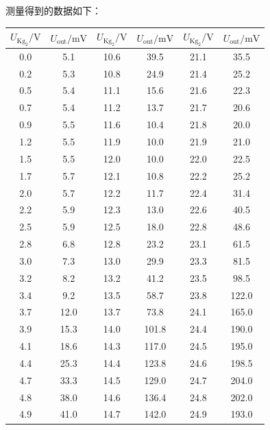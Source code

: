 \documentclass[a4paper,fontset=windows]{ctexart}
\begin{document}
    测量得到的数据如下：
    \begin{center}\Large
        \begin{longtable}{ cccccc }
            \toprule[0.1em]
            $U_{\mathrm{Kg_2}}/\mathrm{V}$ & $U_{\mathrm{out}}/\mathrm{mV}$ & $U_{\mathrm{Kg_2}}/\mathrm{V}$ & $U_{\mathrm{out}}/\mathrm{mV}$ & $U_{\mathrm{Kg_2}}/\mathrm{V}$ & $U_{\mathrm{out}}/\mathrm{mV}$ \\
            \midrule[0.06em]
            0.0  &  5.1  & 10.6 & 39.5  & 21.1 & 35.5  \\
            0.2  &  5.3  & 10.8 & 24.9  & 21.4 & 25.2  \\
            0.5  &  5.4  & 11.1 & 15.6  & 21.6 & 22.3  \\
            0.7  &  5.4  & 11.2 & 13.7  & 21.7 & 20.6  \\
            0.9  &  5.5  & 11.6 & 10.4  & 21.8 & 20.0  \\
            1.2  &  5.5  & 11.9 & 10.0  & 21.9 & 21.0  \\
            1.5  &  5.5  & 12.0 & 10.0  & 22.0 & 22.5  \\
            1.7  &  5.7  & 12.1 & 10.8  & 22.2 & 25.2  \\
            2.0  &  5.7  & 12.2 & 11.7  & 22.4 & 31.4  \\
            2.2  &  5.9  & 12.3 & 13.0  & 22.6 & 40.5  \\
            2.5  &  5.9  & 12.5 & 18.0  & 22.8 & 48.6  \\
            2.8  &  6.8  & 12.8 & 23.2  & 23.1 & 61.5  \\
            3.0  &  7.3  & 13.0 & 29.9  & 23.3 & 81.5  \\
            3.2  &  8.2  & 13.2 & 41.2  & 23.5 & 98.5  \\
            3.4  &  9.2  & 13.5 & 58.7  & 23.8 & 122.0 \\
            3.7  & 12.0  & 13.7 & 73.8  & 24.1 & 165.0 \\
            3.9  & 15.3  & 14.0 & 101.8 & 24.4 & 190.0 \\
            4.1  & 18.6  & 14.3 & 117.0 & 24.5 & 195.0 \\
            4.4  & 25.3  & 14.4 & 123.8 & 24.6 & 198.5 \\
            4.7  & 33.3  & 14.5 & 129.0 & 24.7 & 204.0 \\
            4.8  & 38.0  & 14.6 & 136.4 & 24.8 & 202.0 \\
            4.9  & 41.0  & 14.7 & 142.0 & 24.9 & 193.0 \\

\end{longtable}
\end{center}
\end{document}

